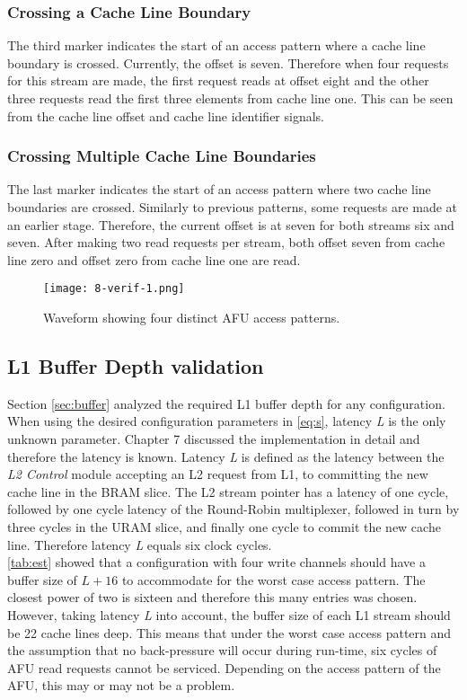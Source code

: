 \subsubsection{Crossing a Cache Line Boundary}
The third marker indicates the start of an access pattern where a cache line boundary is crossed. Currently, the offset is seven. Therefore when four requests for this stream are made, the first request reads at offset eight and the other three requests read the first three elements from cache line one. This can be seen from the cache line offset and cache line identifier signals.

\subsubsection{Crossing Multiple Cache Line Boundaries}
The last marker indicates the start of an access pattern where two cache line boundaries are crossed. Similarly to previous patterns, some requests are made at an earlier stage. Therefore, the current offset is at seven for both streams six and seven. After making two read requests per stream, both offset seven from cache line zero and offset zero from cache line one are read.

\begin{figure}[H]
  \centering
  \texttt{[image: 8-verif-1.png]}
  \caption{Waveform showing four distinct AFU access patterns.}
  \label{fig:8-verif-1}
\end{figure}



\subsection{L1 Buffer Depth validation}
Section \ref{sec:buffer} analyzed the required L1 buffer depth for any configuration. When using the desired configuration parameters in \autoref{eq:s}, latency \textit{L} is the only unknown parameter. Chapter 7 discussed the implementation in detail and therefore the latency is known. Latency \textit{L} is defined as the latency between the \textit{L2 Control} module accepting an L2 request from L1, to committing the new cache line in the BRAM slice. The L2 stream pointer has a latency of one cycle, followed by one cycle latency of the Round-Robin multiplexer, followed in turn by three cycles in the URAM slice, and finally one cycle to commit the new cache line. Therefore latency \textit{L} equals six clock cycles.\\
\autoref{tab:est} showed that a configuration with four write channels should have a buffer size of $L + 16$ to accommodate for the worst case access pattern. The closest power of two is sixteen and therefore this many entries was chosen. However, taking latency \textit{L} into account, the buffer size of each L1 stream should be 22 cache lines deep. This means that under the worst case access pattern and the assumption that no back-pressure will occur during run-time, six cycles of AFU read requests cannot be serviced. Depending on the access pattern of the AFU, this may or may not be a problem.

